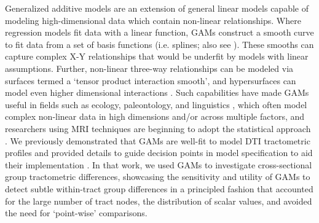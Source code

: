 \documentclass[12pt]{article}
\begin{document}
Generalized additive models \parencite[GAMs;][]{wood2017GeneralizedAdditiveModels,pedersen2019HierarchicalGeneralizedAdditive,stasinopoulos2008GeneralizedAdditiveModels} are an extension of general linear models capable of modeling high-dimensional data which contain non-linear relationships. Where regression models fit data with a linear function, GAMs construct a smooth curve to fit data from a set of basis functions (i.e. splines; also see \textcite{verbyla1999AnalysisDesignedExperiments}). These smooths can capture complex X-Y relationships that would be underfit by models with linear assumptions. Further, non-linear three-way relationships can be modeled via surfaces termed a `tensor product interaction smooth', and hypersurfaces can model even higher dimensional interactions \parencite{baayen2020IntroductionGeneralizedAdditive}. Such capabilities have made GAMs useful in fields such as ecology, paleontology, and linguistics \parencite[e.g.][]{simpson2018ModellingPalaeoecologicalTime,pedersen2019HierarchicalGeneralizedAdditive,schmidt2011SpatiallyExplicitHeight,wieling2011QuantitativeSocialDialectology,simpson2018ModellingPalaeoecologicalTime,wieling2018AnalyzingDynamicPhonetic,murase2009ApplicationGeneralizedAdditive,vanrij2019AnalyzingTimeCourse}, which often model complex non-linear data in high dimensions and/or across multiple factors, and researchers using MRI techniques are beginning to adopt the statistical approach \parencite[e.g.][]{lee2025AtypicalMaturationFunctional,xu2025AgeBSASexspecific,wierenga2018UnravelingAgePuberty,mundo2022GeneralizedAdditiveModels,roy2025DevelopmentArcuateFasciculus,sorensen2021MetaanalysisGeneralizedAdditive,caffarra2024DevelopmentAlphaRhythm}. We previously demonstrated that GAMs are well-fit to model DTI tractometric profiles and provided details to guide decision points in model specification to aid their implementation \parencite{muncy2022GeneralAdditiveModels}. In that work, we used GAMs to investigate cross-sectional group tractometric differences, showcasing the sensitivity and utility of GAMs to detect subtle within-tract group differences in a principled fashion that accounted for the large number of tract nodes, the distribution of scalar values, and avoided the need for `point-wise' comparisons.
\end{document}
